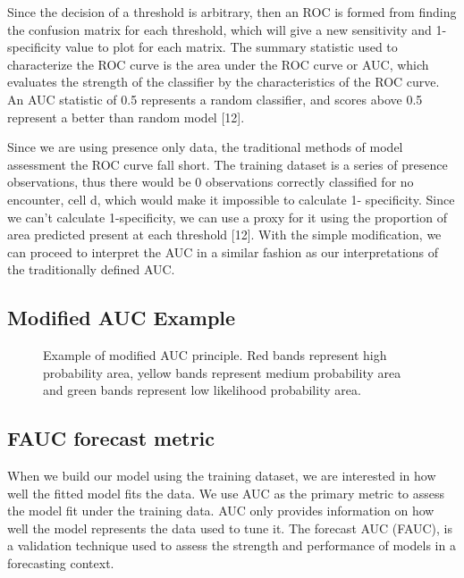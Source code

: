 \noindent Since the decision of a threshold is arbitrary, then an ROC is formed from finding the confusion matrix for each threshold, which will give a new sensitivity and 1-specificity value to plot for each matrix. The summary statistic used to characterize the ROC curve is the area under the ROC curve or AUC, which evaluates the strength of the classifier by the characteristics of the ROC curve. An AUC statistic of 0.5 represents a random classifier, and scores above 0.5 represent a better than random model [12].    \newline

\noindent Since we are using presence only data, the traditional methods of model assessment the ROC curve fall short. The training dataset is a series of presence observations, thus there would be 0 observations correctly classified for no encounter, cell d,  which would make it impossible to calculate 1- specificity. Since we can't calculate 1-specificity, we can use a proxy for it using the proportion of area predicted present at each threshold [12]. With the simple modification, we can proceed to interpret the AUC in a similar fashion as our interpretations of the traditionally defined AUC. \newline

\subsection{Modified AUC Example }

\begin{figure} [!ht]
\centerline{}
\caption{Example of modified AUC principle. Red bands represent high probability area, yellow bands represent medium probability area and green bands represent low likelihood probability area.  }
\label{fig6}
\end{figure}


\subsection{FAUC forecast metric}

When we build our model using the training dataset, we are interested in how well the fitted model fits the data. We use AUC as the primary metric to assess the model fit under the training data. AUC only provides information on how well the model represents the data used to tune it. The forecast AUC (FAUC), is a validation technique used to assess the strength and performance of models in a forecasting context. \newline


